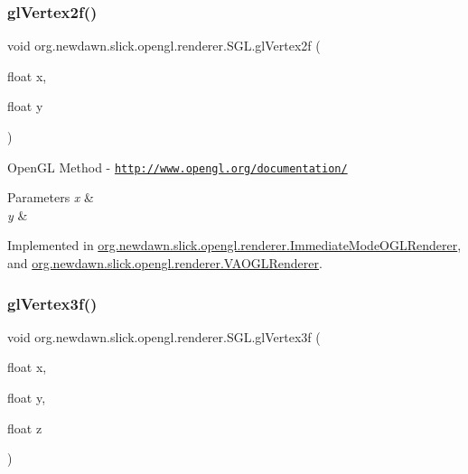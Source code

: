 \mbox{\label{interfaceorg_1_1newdawn_1_1slick_1_1opengl_1_1renderer_1_1_s_g_l_ad9c89f8bb275f22956f7687da5ec27c5}} 
\subsubsection{\texorpdfstring{gl\+Vertex2f()}{glVertex2f()}}
{\footnotesize\ttfamily void org.\+newdawn.\+slick.\+opengl.\+renderer.\+S\+G\+L.\+gl\+Vertex2f (\begin{DoxyParamCaption}\item[{float}]{x,  }\item[{float}]{y }\end{DoxyParamCaption})}

Open\+GL Method -\/  \href{http://www.opengl.org/documentation/}{\tt http\+://www.\+opengl.\+org/documentation/}


\begin{DoxyParams}{Parameters}
{\em x} & \\
\hline
{\em y} & \\
\hline
\end{DoxyParams}


Implemented in \mbox{\hyperlink{classorg_1_1newdawn_1_1slick_1_1opengl_1_1renderer_1_1_immediate_mode_o_g_l_renderer_a0ebc0c399fb4cd6010f9a13f2ebc927f}{org.\+newdawn.\+slick.\+opengl.\+renderer.\+Immediate\+Mode\+O\+G\+L\+Renderer}}, and \mbox{\hyperlink{classorg_1_1newdawn_1_1slick_1_1opengl_1_1renderer_1_1_v_a_o_g_l_renderer_a2d875eda69e18a467a6e17f4e7cfaa17}{org.\+newdawn.\+slick.\+opengl.\+renderer.\+V\+A\+O\+G\+L\+Renderer}}.

\mbox{\label{interfaceorg_1_1newdawn_1_1slick_1_1opengl_1_1renderer_1_1_s_g_l_ae2baba1598d723f9059f45e0871be822}} 
\subsubsection{\texorpdfstring{gl\+Vertex3f()}{glVertex3f()}}
{\footnotesize\ttfamily void org.\+newdawn.\+slick.\+opengl.\+renderer.\+S\+G\+L.\+gl\+Vertex3f (\begin{DoxyParamCaption}\item[{float}]{x,  }\item[{float}]{y,  }\item[{float}]{z }\end{DoxyParamCaption})}

